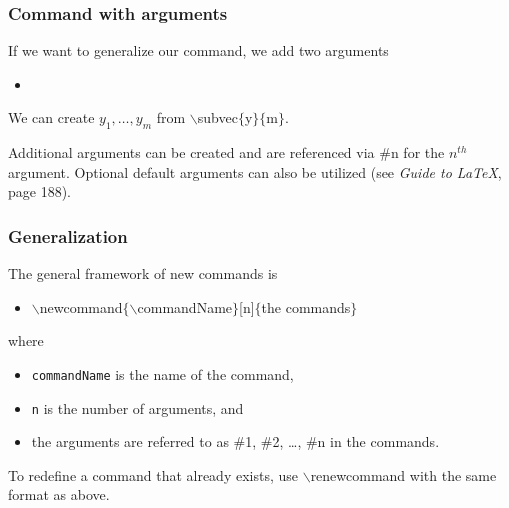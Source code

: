 \newcommand{\subvec}[2]{\ensuremath{#1_{1}, \ldots, #1_{#2}} }
\begin{frame}  \frametitle{Command with arguments}
	If we want to generalize our command, we add two arguments
	\begin{itemize}
		\item[] 
	\end{itemize}
	We can create \subvec{y}{m} from {\color{command}$\backslash$subvec\color{braces}$\{${\color{black}y}$\}\{${\color{black}m}$\}$}.
	
	\vspace{7mm}
	
	Additional arguments can be created and are referenced via \#n for the $n^{th}$ argument. Optional default arguments can also be utilized (see \textit{Guide to LaTeX}, page 188).
\end{frame}

\begin{frame}  \frametitle{Generalization}
	The general framework of new commands is
	\vspace{0.5mm} \\
	\begin{itemize}
		\item[] {\color{command}$\backslash$newcommand\color{braces}$\{${\color{command}$\backslash$commandName}$\}${\color{black}[n]}$\{${\color{highlight}the commands}$\}$}
	\end{itemize}
	\vspace{0.5mm}
	where
	\vspace{0.5mm} \\
	\begin{itemize}
		\item \texttt{commandName} is the name of the command,
		\item \texttt{n} is the number of arguments, and
		\item the arguments are referred to as \#1, \#2, \dots, \#n in {\color{highlight}the commands}.
	\end{itemize}
	\vspace{0.5mm}
	To redefine a command that already exists, use {\color{command}$\backslash$renewcommand} with the same format as above.
\end{frame}


